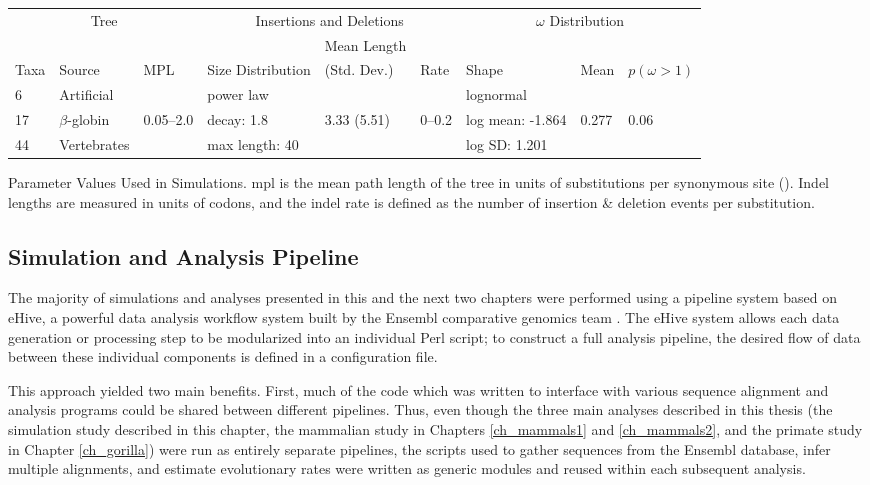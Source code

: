 \bbtable
\centering
\begin{tabular}{lllllllll}
\toprule
 \multicolumn{3}{c}{Tree} & \multicolumn{3}{c}{Insertions and Deletions} & \multicolumn{3}{c}{$\omega$ Distribution} \\
\cmidrule(r){1-3} \cmidrule(r){4-6} \cmidrule(r){7-9}
 & & &  & Mean Length & & & & \\
Taxa & Source & MPL & Size Distribution & (Std. Dev.) & Rate & Shape & Mean & $p (\omega>1)$ \\
\midrule
6 & Artificial & & power law & & & lognormal & & \\
17 & $\beta$-globin & 0.05--2.0 & decay: 1.8 & 3.33 (5.51) & 0--0.2 & log mean: -1.864 & 0.277 & 0.06 \\
44 & Vertebrates & & max length: 40 & & &  log SD: 1.201 & & \\
\bottomrule
\end{tabular}
\caption{Parameter Values Used in Simulations. \ac{mpl} is the mean
  path length of the tree in units of substitutions per synonymous
  site (\ds). Indel lengths are measured in units of codons, and the
  indel rate is defined as the number of insertion \& deletion events
  per substitution.}
\label{table_indels_1}
\eetable

\subsection{Simulation and Analysis Pipeline}


The majority of simulations and analyses presented in this and the
next two chapters were performed using a pipeline system based on
eHive, a powerful data analysis workflow system built by the Ensembl
comparative genomics team \citep{Severin2010}. The eHive system allows
each data generation or processing step to be modularized into an
individual Perl script; to construct a full analysis pipeline, the
desired flow of data between these individual components is defined in
a configuration file.

This approach yielded two main benefits. First, much of the code which
was written to interface with various sequence alignment and analysis
programs could be shared between different pipelines. Thus, even
though the three main analyses described in this thesis (the
simulation study described in this chapter, the mammalian study in
Chapters \ref{ch_mammals1} and \ref{ch_mammals2}, and the primate
study in Chapter \ref{ch_gorilla}) were run as entirely separate
pipelines, the scripts used to gather sequences from the Ensembl
database, infer multiple alignments, and estimate evolutionary rates
were written as generic modules and reused within each subsequent
analysis.

